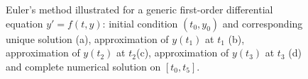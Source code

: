 \begin{figure}
\centering
\centerline{
\hspace{1cm}
}
\centerline{
\hspace{1cm}
}
\centerline{
}
\caption{Euler's method illustrated for a generic first-order differential equation $y'=f(t,y)$: initial condition $(t_0,y_0)$ and corresponding unique solution (a), approximation of $y(t_1)$ at $t_1$ (b), approximation of $y(t_2)$ at $t_2$(c), approximation of $y(t_3)$ at $t_3$ (d) and complete numerical solution on $[t_0,t_5]$.}
\label{Euler}
\end{figure}

